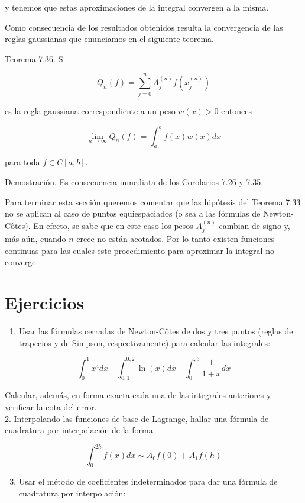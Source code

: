 \documentclass[10pt]{book}
\begin{document}
y tenemos que estas aproximaciones de la integral convergen a la misma.

Como consecuencia de los resultados obtenidos resulta la convergencia de las reglas gaussianas que enunciamos en el siguiente teorema.

Teorema 7.36. Si

$$
Q_{n}(f)=\sum_{j=0}^{n} A_{j}^{(n)} f\left(x_{j}^{(n)}\right)
$$

es la regla gaussiana correspondiente a un peso $w(x)>0$ entonces

$$
\lim _{n \rightarrow \infty} Q_{n}(f)=\int_{a}^{b} f(x) w(x) d x
$$

para toda $f \in C[a, b]$.

Demostración. Es consecuencia inmediata de los Corolarios 7.26 y 7.35.

Para terminar esta sección queremos comentar que las hipótesis del Teorema 7.33 no se aplican al caso de puntos equiespaciados (o sea a las fórmulas de Newton-Côtes). En efecto, se sabe que en este caso los pesos $A_{j}^{(n)}$ cambian de signo y, más aún, cuando $n$ crece no están acotados. Por lo tanto existen funciones continuas para las cuales este procedimiento para aproximar la integral no converge.

\section{Ejercicios}
\begin{enumerate}
  \item Usar las fórmulas cerradas de Newton-Côtes de dos y tres puntos (reglas de trapecios y de Simpson, respectivamente) para calcular las integrales:
\end{enumerate}

$$
\int_{0}^{1} x^{4} d x \quad \int_{0,1}^{0,2} \ln (x) d x \quad \int_{0}^{, 3} \frac{1}{1+x} d x
$$

Calcular, además, en forma exacta cada una de las integrales anteriores y verificar la cota del error.\\
2. Interpolando las funciones de base de Lagrange, hallar una fórmula de cuadratura por interpolación de la forma

$$
\int_{0}^{2 h} f(x) d x \sim A_{0} f(0)+A_{1} f(h)
$$

\begin{enumerate}
  \setcounter{enumi}{2}
  \item Usar el método de coeficientes indeterminados para dar una fórmula de cuadratura por interpolación:
\end{enumerate}
\end{document}
